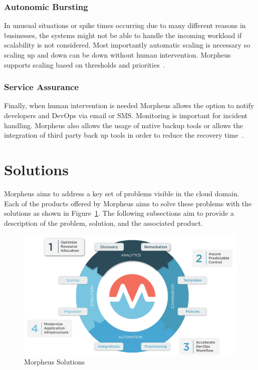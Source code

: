 \subsubsection{Autonomic Bursting}

In unusual situations or spike times occurring due to many different reasons in 
businesses, the systems might not be able to handle the incoming workload if 
scalability is not considered. Most importantly automatic scaling is necessary 
so scaling up and down can be down without human intervention. Morpheus 
supports scaling based on thresholds and 
priorities~\cite{hid-sp18-416-www-morpheus-architecture}.

\subsubsection{Service Assurance}

Finally, when human intervention is needed Morpheus allows the option to notify 
developers and DevOps via email or SMS. Monitoring is important for incident 
handling. Morpheus also allows the usage of native backup tools or allows the 
integration of third party back up tools in order to reduce the recovery 
time~\cite{hid-sp18-416-www-morpheus-architecture}. 

\section{Solutions}
\label{sec:solutions}

Morpheus aims to address a key set of problems visible in the cloud domain. 
Each of the products offered by Morpheus aims to solve these problems with the 
solutions as shown in Figure~\ref{fig:solutions}. The following subsections aim 
to provide a description of the problem, solution, and the associated product.

\begin{figure}[htb]
	\centering
	\includegraphics[width=\columnwidth]{../images/MorpheusSolutions.png}
	\caption{Morpheus Solutions~\cite{hid-sp18-416-www-morpheus-solutions}}
\label{fig:solutions}
\end{figure}


